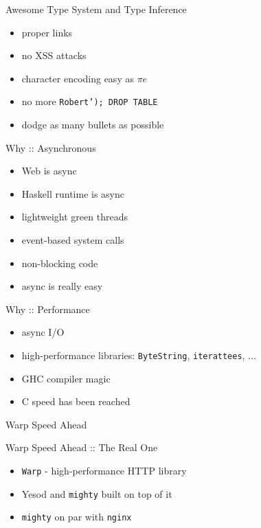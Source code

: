 \documentclass{beamer}
\begin{document}
\begin{frame}{Awesome Type System and Type Inference}
  \begin{itemize}[<+->]
    \item proper links
    \item no XSS attacks
    \item character encoding easy as $\pi e$
    \item no more \texttt{Robert'); DROP TABLE}
    \item dodge as many bullets as possible
  \end{itemize}
\end{frame}

\begin{frame}{Why :: Asynchronous}
  \begin{itemize}[<+->]
    \item Web is async
    \item Haskell runtime is async
    \item lightweight green threads
    \item event-based system calls
    \item non-blocking code
    \item async is really easy
  \end{itemize}
\end{frame}

\begin{frame}{Why :: Performance}
  \begin{center}\end{center}
  \begin{itemize}[<+->]
    \item async I/O
    \item high-performance libraries: \texttt{ByteString},
    \texttt{iterattees}, $\ldots$
    \item GHC compiler magic
    \item C speed has been reached
  \end{itemize}
\end{frame}

\begin{frame}{Warp Speed Ahead}
  \begin{center}\end{center}
\end{frame}

\begin{frame}{Warp Speed Ahead :: The Real One}
  \begin{itemize}[<+->]
    \item \texttt{Warp} - high-performance HTTP library
    \item Yesod and \texttt{mighty} built on top of it
    \item \texttt{mighty} on par with \texttt{nginx}
  \end{itemize}
\end{frame}
\end{document}
